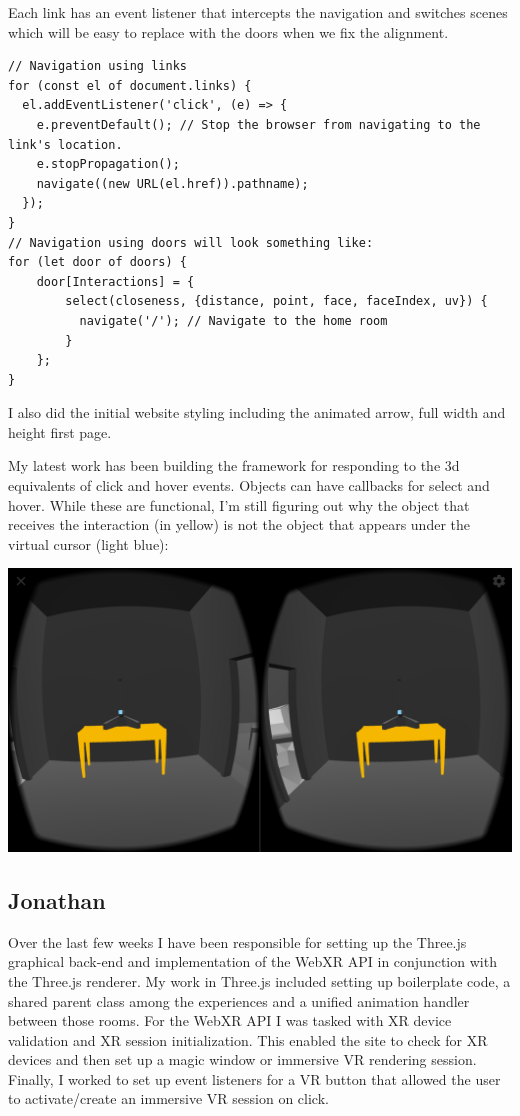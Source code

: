 \documentclass[onecolumn, draftclsnofoot,10pt, compsoc]{IEEEtran}
\begin{document}
Each link has an event listener that intercepts the navigation and switches scenes which will be easy to replace with the doors when we fix the alignment.

\begin{lstlisting}
// Navigation using links
for (const el of document.links) {
  el.addEventListener('click', (e) => {
    e.preventDefault(); // Stop the browser from navigating to the link's location.
    e.stopPropagation();
    navigate((new URL(el.href)).pathname);
  });
}
// Navigation using doors will look something like:
for (let door of doors) {
    door[Interactions] = {
        select(closeness, {distance, point, face, faceIndex, uv}) {
          navigate('/'); // Navigate to the home room
        }
    };
}
\end{lstlisting}

I also did the initial website styling including the animated arrow, full width and height first page.

My latest work has been building the framework for responding to the 3d equivalents of click and hover events.  Objects can have callbacks for select and hover.  While these are functional, I'm still figuring out why the object that receives the interaction (in yellow) is not the object that appears under the virtual cursor (light blue):

\includegraphics[width=\linewidth]{images/pendulum-select_offset.png}


\subsection{Jonathan}
Over the last few weeks I have been responsible for setting up the Three.js graphical back-end and implementation of the WebXR API in conjunction with the Three.js renderer. My work in Three.js included setting up boilerplate code, a shared parent class among the experiences and a unified animation handler between those rooms. For the WebXR API I was tasked with XR device validation and XR session initialization. This enabled the site to check for XR devices and then set up a magic window or immersive VR rendering session. Finally, I worked to set up event listeners for a VR button that allowed the user to activate/create an immersive VR session on click.
\end{document}
